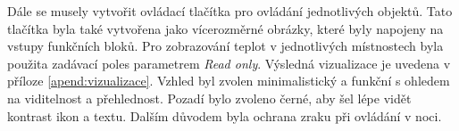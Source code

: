 Dále se musely vytvořit ovládací tlačítka pro ovládání jednotlivých objektů. Tato tlačítka byla také vytvořena jako vícerozměrné obrázky, které byly napojeny na vstupy funkčních bloků. Pro zobrazování teplot v jednotlivých místnostech byla použita zadávací poles parametrem \textit{Read only}. 
Výsledná vizualizace je uvedena v příloze \ref{apend:vizualizace}. Vzhled byl zvolen minimalistický a funkční s ohledem na viditelnost a přehlednost. Pozadí bylo zvoleno černé, aby šel lépe vidět kontrast ikon a textu. Dalším důvodem byla ochrana zraku při ovládání v noci.